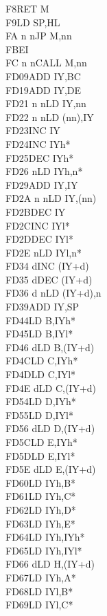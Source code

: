 \documentclass[oneside,a4paper]{book}
\begin{document}
\begin{multicols}{3}
{\begin{tabbing}
F8\>RET M\\
F9\>LD SP,HL\\
FA n n\>JP M,nn\\
FB\>EI\\
FC n n\>CALL M,nn\\
FD09\>ADD IY,BC\\
FD19\>ADD IY,DE\\
FD21 n n\>LD IY,nn\\
FD22 n n\>LD (nn),IY\\
FD23\>INC IY\\
FD24\>INC IYh*\\
FD25\>DEC IYh*\\
FD26 n\>LD IYh,n*\\
FD29\>ADD IY,IY\\
FD2A n n\>LD IY,(nn)\\
FD2B\>DEC IY\\
FD2C\>INC IYl*\\
FD2D\>DEC IYl*\\
FD2E n\>LD IYl,n*\\
FD34 d\>INC (IY+d)\\
FD35 d\>DEC (IY+d)\\
FD36 d n\>LD (IY+d),n\\
FD39\>ADD IY,SP\\
FD44\>LD B,IYh*\\
FD45\>LD B,IYl*\\
FD46 d\>LD B,(IY+d)\\
FD4C\>LD C,IYh*\\
FD4D\>LD C,IYl*\\
FD4E d\>LD C,(IY+d)\\
FD54\>LD D,IYh*\\
FD55\>LD D,IYl*\\
FD56 d\>LD D,(IY+d)\\
FD5C\>LD E,IYh*\\
FD5D\>LD E,IYl*\\
FD5E d\>LD E,(IY+d)\\
FD60\>LD IYh,B*\\
FD61\>LD IYh,C*\\
FD62\>LD IYh,D*\\
FD63\>LD IYh,E*\\
FD64\>LD IYh,IYh*\\
FD65\>LD IYh,IYl*\\
FD66 d\>LD H,(IY+d)\\
FD67\>LD IYh,A*\\
FD68\>LD IYl,B*\\
FD69\>LD IYl,C*\\

\end{tabbing}}
\end{multicols}
\end{document}
